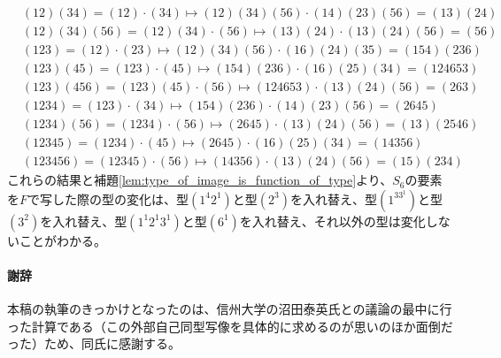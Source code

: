 \documentclass[11pt]{jarticle}
\begin{document}
\begin{displaymath}
\begin{split}
&(12)(34) = (12) \cdot (34) \mapsto (12)(34)(56) \cdot (14)(23)(56) = (13)(24) \\
&(12)(34)(56) = (12)(34) \cdot (56) \mapsto (13)(24) \cdot (13)(24)(56) = (56) \\
&(123) = (12) \cdot (23) \mapsto (12)(34)(56) \cdot (16)(24)(35) = (154)(236) \\
&(123)(45) = (123) \cdot (45) \mapsto (154)(236) \cdot (16)(25)(34) = (124653) \\
&(123)(456) = (123)(45) \cdot (56) \mapsto (124653) \cdot (13)(24)(56) = (263) \\
&(1234) = (123) \cdot (34) \mapsto (154)(236) \cdot (14)(23)(56) = (2645) \\
&(1234)(56) = (1234) \cdot (56) \mapsto (2645) \cdot (13)(24)(56) = (13)(2546) \\
&(12345) = (1234) \cdot (45) \mapsto (2645) \cdot (16)(25)(34) = (14356) \\
&(123456) = (12345) \cdot (56) \mapsto (14356) \cdot (13)(24)(56) = (15)(234)
\end{split}
\end{displaymath}
これらの結果と補題\ref{lem:type_of_image_is_function_of_type}より、$S_6$の要素を$F$で写した際の型の変化は、型$(1^4 2^1)$と型$(2^3)$を入れ替え、型$(1^33^1)$と型$(3^2)$を入れ替え、型$(1^1 2^1 3^1)$と型$(6^1)$を入れ替え、それ以外の型は変化しないことがわかる。

\paragraph{謝辞}
本稿の執筆のきっかけとなったのは、信州大学の沼田泰英氏との議論の最中に行った計算である（この外部自己同型写像を具体的に求めるのが思いのほか面倒だった）ため、同氏に感謝する。
\end{document}
